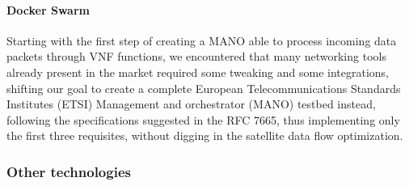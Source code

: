 \documentclass[10pt]{book}
\begin{document}
\paragraph{Docker Swarm} 

\vspace{0.5cm}

Starting with the first step of creating a MANO able to process incoming data 
packets through VNF functions, we encountered that many networking tools already 
present in the market required some tweaking and some integrations, shifting our 
goal to create a complete  European Telecommunications Standards Institutes 
(ETSI) Management and orchestrator (MANO) testbed instead, following the 
specifications suggested in the RFC 7665, thus implementing only the first three 
requisites, without digging in the satellite data flow optimization.

\subsubsection{Other technologies}
\end{document}
